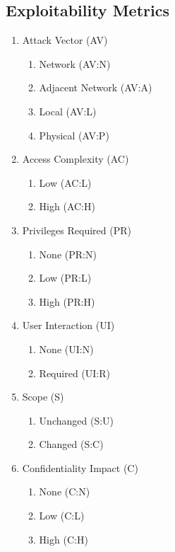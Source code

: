 \documentclass[a4paper, 12pt]{article}
\begin{document}
\setcounter{section}{1}
\subsection*{Exploitability Metrics}
\begin{multicols}{2}
  \begin{enumerate}
      \item Attack Vector (AV)
          \begin{enumerate}
              \item Network (AV:N)
              \item Adjacent Network (AV:A)
              \item Local (AV:L)
              \item Physical (AV:P)
          \end{enumerate}

      \item Access Complexity (AC)
          \begin{enumerate}
              \item Low (AC:L)
              \item High (AC:H)
          \end{enumerate}

      \item Privileges Required (PR)
          \begin{enumerate}
              \item None (PR:N)
              \item Low (PR:L)
              \item High (PR:H)
          \end{enumerate}

      \item User Interaction (UI)
          \begin{enumerate}
              \item None (UI:N)
              \item Required (UI:R)
          \end{enumerate}

      \item Scope (S)
          \begin{enumerate}
              \item Unchanged (S:U)
              \item Changed (S:C)
          \end{enumerate}

      \item Confidentiality Impact (C)
          \begin{enumerate}
              \item None (C:N)
              \item Low (C:L)
              \item High (C:H)
          \end{enumerate}


\end{enumerate}
\end{multicols}
\end{document}
